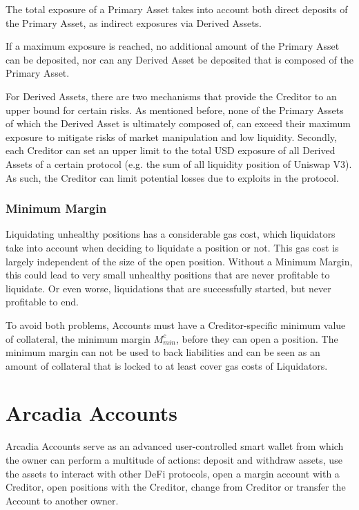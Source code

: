 \documentclass[sigconf,nonacm]{acmart}
\begin{document}
The total exposure of a Primary Asset takes into account both direct deposits of the Primary Asset, as indirect exposures via Derived Assets.

If a maximum exposure is reached, no additional amount of the Primary Asset can be deposited,
nor can any Derived Asset be deposited that is composed of the Primary Asset.

For Derived Assets, there are two mechanisms that provide the Creditor to an upper bound for certain risks.
As mentioned before, none of the Primary Assets of which the Derived Asset is ultimately composed of, can exceed their maximum exposure to mitigate risks of market manipulation and low liquidity.
Secondly, each Creditor can set an upper limit to the total USD exposure of all Derived Assets of a certain protocol (e.g. the sum of all liquidity position of Uniswap V3).
As such, the Creditor can limit potential losses due to exploits in the protocol.

\subsubsection{Minimum Margin}
\label{subsubsec:minimum-margin}
Liquidating unhealthy positions has a considerable gas cost, which liquidators take into account when deciding to liquidate a position or not.
This gas cost is largely independent of the size of the open position.
Without a Minimum Margin, this could lead to very small unhealthy positions that are never profitable to liquidate.
Or even worse, liquidations that are successfully started, but never profitable to end.

To avoid both problems, Accounts must have a Creditor-specific minimum value of collateral, the minimum margin $M_{min}^c$, before they can open a position.
The minimum margin can not be used to back liabilities and can be seen as an amount of collateral that is locked to at least cover gas costs of Liquidators.

\section{Arcadia Accounts}
\label{sec:arcadia-accounts}
Arcadia Accounts serve as an advanced user-controlled smart wallet from which the owner can perform a multitude of actions: deposit and withdraw assets,
use the assets to interact with other DeFi protocols, open a margin account with a Creditor, open positions with the Creditor,
change from Creditor or transfer the Account to another owner.
\end{document}

